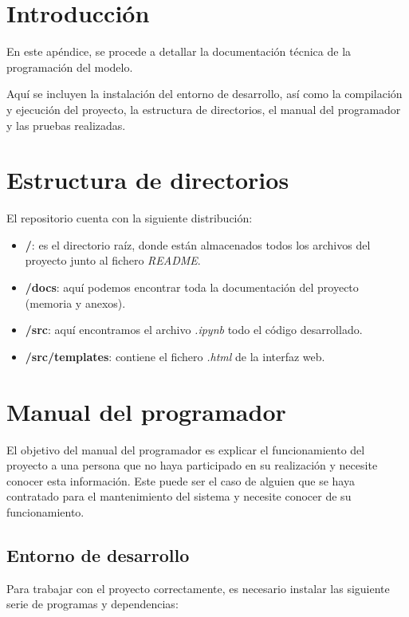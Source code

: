 
\section{Introducción}

En este apéndice, se procede a detallar la documentación técnica de la programación del modelo.

Aquí se incluyen la instalación del entorno de desarrollo, así como la compilación y ejecución del proyecto, la estructura de directorios, el manual del programador y las pruebas realizadas.

\section{Estructura de directorios}

El repositorio cuenta con la siguiente distribución:
\begin{itemize}
    \item \textbf{/}: es el directorio raíz, donde están almacenados todos los archivos del proyecto junto al fichero \textit{README}.
    \item \textbf{/docs}: aquí podemos encontrar toda la documentación del proyecto (memoria y anexos).
    \item \textbf{/src}: aquí encontramos el archivo \textit{.ipynb} todo el código desarrollado.
    \item \textbf{/src/templates}: contiene el fichero \textit{.html} de la interfaz web.
\end{itemize}


\section{Manual del programador}

El objetivo del manual del programador es explicar el funcionamiento del proyecto a una persona que no haya participado en su realización y necesite conocer esta información. Este puede ser el caso de alguien que se haya contratado para el mantenimiento del sistema y necesite conocer de su funcionamiento.

\subsection{Entorno de desarrollo}

Para trabajar con el proyecto correctamente, es necesario instalar las siguiente serie de programas y dependencias:

